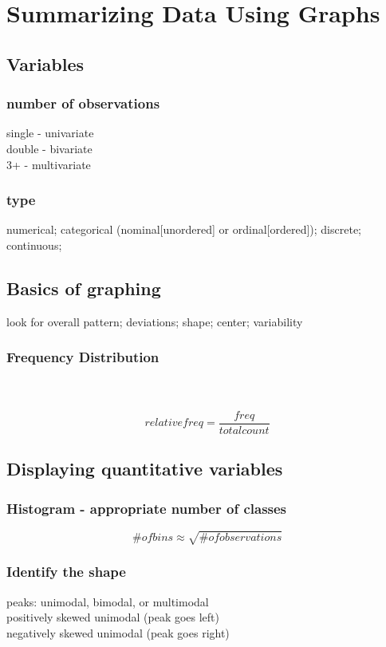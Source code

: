 \chapter{Summarizing Data Using Graphs}  %

\section{Variables}  %
\subsection{number of observations}  %
single - univariate \\
double - bivariate \\
3+ - multivariate
\subsection{type}  %
numerical; categorical (nominal[unordered] or ordinal[ordered]); discrete; continuous;

\section{Basics of graphing}  %
look for overall pattern; deviations; shape; center; variability

\subsection{Frequency Distribution}  %
\\
\\
\begin{equation}
    relative freq = \frac{freq}{total count}
\end{equation}


\section{Displaying quantitative variables}  %
\subsection{Histogram - appropriate number of classes}  %
\[
    \# of bins \approx \sqrt{\# of observations}
\]
\subsection{Identify the shape}  %
peaks: unimodal, bimodal, or multimodal\\
positively skewed unimodal (peak goes left)\\
negatively skewed unimodal (peak goes right)

